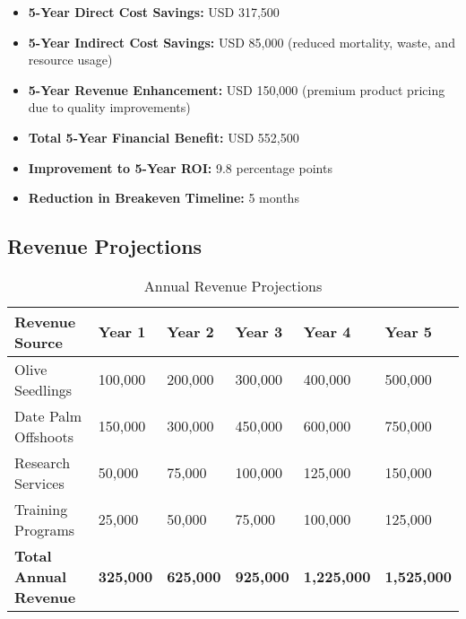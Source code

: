 \begin{itemize}
    \item \textbf{5-Year Direct Cost Savings:} USD 317,500
    \item \textbf{5-Year Indirect Cost Savings:} USD 85,000 (reduced mortality, waste, and resource usage)
    \item \textbf{5-Year Revenue Enhancement:} USD 150,000 (premium product pricing due to quality improvements)
    \item \textbf{Total 5-Year Financial Benefit:} USD 552,500
    \item \textbf{Improvement to 5-Year ROI:} 9.8 percentage points
    \item \textbf{Reduction in Breakeven Timeline:} 5 months
\end{itemize}

\subsection{Revenue Projections}

\begin{table}[h]
\centering
\begin{tabular}{p{}p{}p{}p{}p{}p{}}
\hline
\textbf{Revenue Source} & \textbf{Year 1} & \textbf{Year 2} & \textbf{Year 3} & \textbf{Year 4} & \textbf{Year 5} \\
\hline
Olive Seedlings & 100,000 & 200,000 & 300,000 & 400,000 & 500,000 \\
Date Palm Offshoots & 150,000 & 300,000 & 450,000 & 600,000 & 750,000 \\
Research Services & 50,000 & 75,000 & 100,000 & 125,000 & 150,000 \\
Training Programs & 25,000 & 50,000 & 75,000 & 100,000 & 125,000 \\
\hline
\textbf{Total Annual Revenue} & \textbf{325,000} & \textbf{625,000} & \textbf{925,000} & \textbf{1,225,000} & \textbf{1,525,000} \\
\hline
\end{tabular}
\caption{Annual Revenue Projections}
\end{table}

